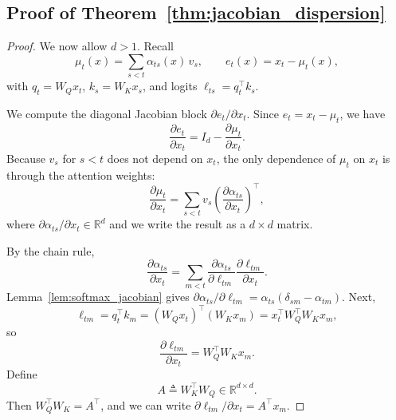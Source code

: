 \documentclass[11pt]{article}
\begin{document}
\subsection{Proof of Theorem~\ref{thm:jacobian_dispersion}}
\label{app:proof_thm_matrix}

\begin{proof}
We now allow $d>1$. Recall
\[
\mu_t(x)=\sum_{s<t}\alpha_{ts}(x)\,v_s,\qquad e_t(x)=x_t-\mu_t(x),
\]
with $q_t=W_Q x_t$, $k_s=W_K x_s$, and logits $\ell_{ts}=q_t^\top k_s$.

We compute the diagonal Jacobian block $\partial e_t/\partial x_t$.
Since $e_t=x_t-\mu_t$, we have
\begin{equation}
\frac{\partial e_t}{\partial x_t}
=
I_d-\frac{\partial \mu_t}{\partial x_t}.
\label{eq:et_block}
\end{equation}
Because $v_s$ for $s<t$ does not depend on $x_t$, the only dependence of $\mu_t$ on $x_t$
is through the attention weights:
\[
\frac{\partial \mu_t}{\partial x_t}
=
\sum_{s<t} v_s \left(\frac{\partial \alpha_{ts}}{\partial x_t}\right)^\top,
\]
where $\partial \alpha_{ts}/\partial x_t\in\mathbb{R}^d$ and we write the result as a $d\times d$ matrix.

By the chain rule,
\[
\frac{\partial \alpha_{ts}}{\partial x_t}
=
\sum_{m<t}\frac{\partial \alpha_{ts}}{\partial \ell_{tm}}
\frac{\partial \ell_{tm}}{\partial x_t}.
\]
Lemma~\ref{lem:softmax_jacobian} gives
$\partial \alpha_{ts}/\partial \ell_{tm}=\alpha_{ts}(\delta_{sm}-\alpha_{tm})$.
Next,
\[
\ell_{tm}=q_t^\top k_m=(W_Q x_t)^\top (W_K x_m)=x_t^\top W_Q^\top W_K x_m,
\]
so
\[
\frac{\partial \ell_{tm}}{\partial x_t}
=
W_Q^\top W_K x_m.
\]
Define
\begin{equation}
A \triangleq W_K^\top W_Q \in \mathbb{R}^{d\times d}.
\label{eq:A_def_app}
\end{equation}
Then $W_Q^\top W_K = A^\top$, and we can write $\partial \ell_{tm}/\partial x_t = A^\top x_m$.


\end{proof}
\end{document}
